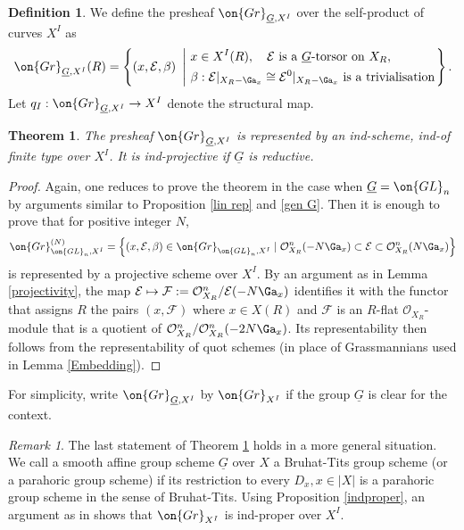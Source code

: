 \documentclass[]{pcmi}
\theoremstyle{plain}
\newtheorem{thm}[equation]{Theorem}
\theoremstyle{remark}
\newtheorem{rmk}[equation]{Remark}
\theoremstyle{definition}
\newtheorem{dfn}[equation]{Definition}
\newcommand{\mE}{{\mathcal E}}
\newcommand{\mF}{{\mathcal F}}
\newcommand{\mO}{{\mathcal O}}
\newcommand{\Gr}{{\on{Gr}}}
\newcommand{\GL}{{\on{GL}}}
\begin{document}
\begin{dfn}
We define the presheaf $\Gr_{\underline G,X^I}$ over the self-product of curves $X^I$ as
\begin{equation}\label{BD Grass def}
\Gr_{\underline G, X^I}(R)=\left\{(x,\mE,\beta)\ \left|\ \begin{split}&x\in X^I(R),\quad \mE \mbox{ is a } \underline{G}\mbox{-torsor on } X_R, \\
& \beta: \mE|_{X_R-\Ga_x}\cong \mE^0|_{X_R-\Ga_x} \mbox{ is a trivialisation}\end{split}\right.\right\}.
\end{equation}
Let $q_I:\Gr_{\underline G,X^I}\to X^I$ denote the structural map.
\end{dfn}

\begin{thm}\label{representability of BD}
The presheaf $\Gr_{\underline G, X^I}$ is represented by an ind-scheme, ind-of finite type over $X^I$. It is ind-projective if $\underline G$ is reductive.
\end{thm}
\begin{proof}
Again, one reduces to prove the theorem in the case when $\underline G=\GL_n$ by arguments similar to Proposition \ref{lin rep} and \ref{gen G}. Then it is enough to prove that for positive integer $N$,
\[\Gr_{\GL_n,X^I}^{(N)}=\left\{(x,\mE,\beta)\in\Gr_{\GL_n,X^I}\mid \mO_{X_R}^n(-N\Ga_x)\subset \mE\subset \mO_{X_R}^{n}(N\Ga_x)\right\}\]
is represented by a projective scheme over $X^I$. By an argument as in Lemma \ref{projectivity}, the map $\mE\mapsto \mF:=\mO_{X_R}^{n}/\mE(-N\Ga_x)$ identifies it with the functor that assigns $R$ the pairs $(x,\mF)$ where $x\in X(R)$ and $\mF$ is an $R$-flat $\mO_{X_R}$-module that is a quotient of $\mO_{X_R}^n/\mO_{X_R}^n(-2N\Ga_x)$.
Its representability then follows from the representability of quot schemes (in place of Grassmannians used in Lemma \ref{Embedding}). 
\end{proof}
For simplicity, write $\Gr_{\underline G,X^I}$ by $\Gr_{X^I}$ if the group $\underline G$ is clear for the context.

\begin{rmk}\label{projectivity of BD}
The last statement of Theorem \ref{representability of BD} holds in a more general situation.
We call a smooth affine group scheme $\underline G$ over $X$ a Bruhat-Tits group scheme (or a parahoric group scheme) if its restriction to every $D_x, x\in |X|$ is a parahoric group scheme in the sense of Bruhat-Tits. Using Proposition \ref{indproper}, an argument as in \cite{PZ} shows that $\Gr_{X^I}$ is ind-proper over $X^I$.
\end{rmk}
\end{document}
